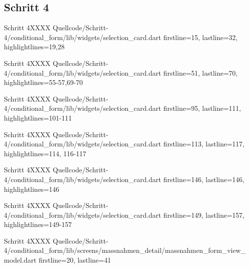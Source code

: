 \clearpage 

\subsection{Schritt 4}

\begin{alexlisting}{Schritt 4}{XXXX}
    {Quellcode/Schritt-4/conditional_form/lib/widgets/selection_card.dart}
    {firstline=15, lastline=32, highlightlines={19,28}}
    \label{lst:Schritt4XXXX}
\end{alexlisting}

\begin{alexlisting}{Schritt 4}{XXXX}
    {Quellcode/Schritt-4/conditional_form/lib/widgets/selection_card.dart}
    {firstline=51, lastline=70, highlightlines={55-57,69-70}}
    \label{lst:Schritt4XXXX}
\end{alexlisting}

\begin{alexlisting}{Schritt 4}{XXXX}
    {Quellcode/Schritt-4/conditional_form/lib/widgets/selection_card.dart}
    {firstline=95, lastline=111, highlightlines={101-111}}
    \label{lst:Schritt4XXXX}
\end{alexlisting}


\begin{alexlisting}{Schritt 4}{XXXX}
    {Quellcode/Schritt-4/conditional_form/lib/widgets/selection_card.dart}
    {firstline=113, lastline=117, highlightlines={114, 116-117}}
    \label{lst:Schritt4XXXX}
\end{alexlisting}

\begin{alexlisting}{Schritt 4}{XXXX}
    {Quellcode/Schritt-4/conditional_form/lib/widgets/selection_card.dart}
    {firstline=146, lastline=146, highlightlines={146}}
    \label{lst:Schritt4XXXX}
\end{alexlisting}

\begin{alexlisting}{Schritt 4}{XXXX}
    {Quellcode/Schritt-4/conditional_form/lib/widgets/selection_card.dart}
    {firstline=149, lastline=157, highlightlines={149-157}}
    \label{lst:Schritt4XXXX}
\end{alexlisting}


\begin{alexlisting}{Schritt 4}{XXXX}
    {Quellcode/Schritt-4/conditional_form/lib/screens/massnahmen_detail/massnahmen_form_view_model.dart}
    {firstline=20, lastline=41}
    \label{lst:Schritt4XXXXX}
  \end{alexlisting}

